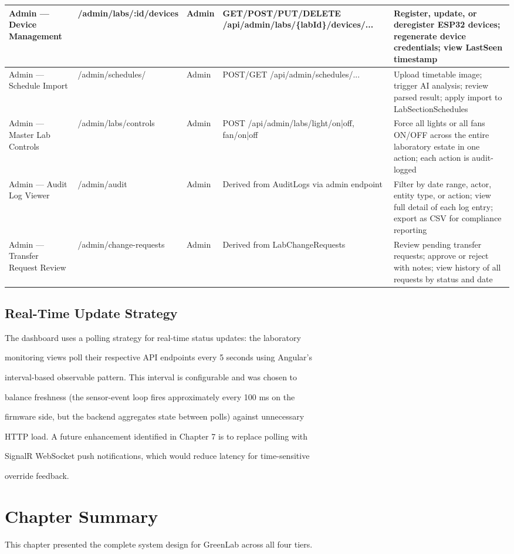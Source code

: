 \begin{longtable}{|L{2.5cm}|L{2.0cm}|L{1.0cm}|L{3.0cm}|L{5.0cm}|}
\hline
Admin --- Device Management & /admin/labs/:id/devices & Admin & GET/POST/PUT/DELETE /api/admin/labs/\{labId\}/devices/... & Register, update, or deregister ESP32 devices; regenerate device credentials; view LastSeen timestamp \\
\hline
Admin --- Schedule Import & /admin/schedules/ & Admin & POST/GET /api/admin/schedules/... & Upload timetable image; trigger AI analysis; review parsed result; apply import to LabSectionSchedules \\
\hline
Admin --- Master Lab Controls & /admin/labs/controls & Admin & POST /api/admin/labs/light/on|off, fan/on|off & Force all lights or all fans ON/OFF across the entire laboratory estate in one action; each action is audit-logged \\
\hline
Admin --- Audit Log Viewer & /admin/audit & Admin & Derived from AuditLogs via admin endpoint & Filter by date range, actor, entity type, or action; view full detail of each log entry; export as CSV for compliance reporting \\
\hline
Admin --- Transfer Request Review & /admin/change-requests & Admin & Derived from LabChangeRequests & Review pending transfer requests; approve or reject with notes; view history of all requests by status and date \\
\hline
\end{longtable}


\subsection{Real-Time Update Strategy}
The dashboard uses a polling strategy for real-time status updates: the laboratory

monitoring views poll their respective API endpoints every 5 seconds using Angular's

interval-based observable pattern. This interval is configurable and was chosen to

balance freshness (the sensor-event loop fires approximately every 100 ms on the

firmware side, but the backend aggregates state between polls) against unnecessary

HTTP load. A future enhancement identified in Chapter 7 is to replace polling with

SignalR WebSocket push notifications, which would reduce latency for time-sensitive

override feedback.


\section{Chapter Summary}
This chapter presented the complete system design for GreenLab across all four tiers.

